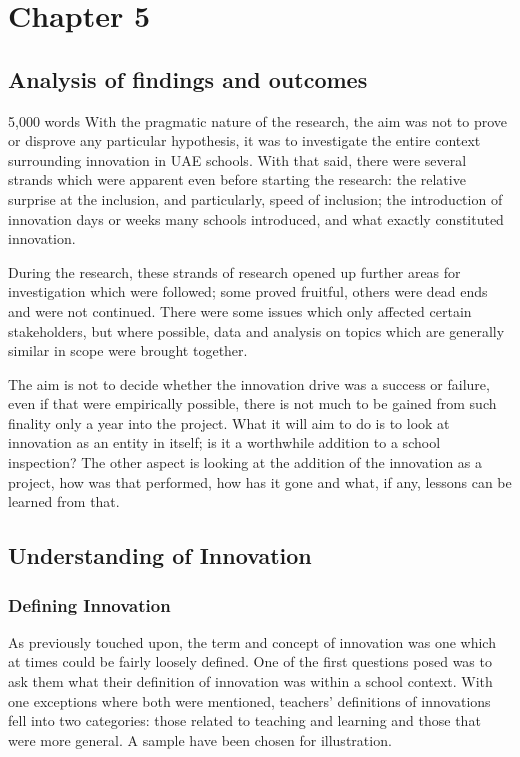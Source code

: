 \section{Chapter 5}
\subsection{Analysis of findings and outcomes}
5,000 words
With the pragmatic nature of the research, the aim was not to prove or disprove any particular hypothesis, it was to investigate the entire context surrounding innovation in UAE schools. With that said, there were several strands which were apparent even before starting the research: the relative surprise at the inclusion, and particularly, speed of inclusion; the introduction of innovation days or weeks many schools introduced, and what exactly constituted innovation.

During the research, these strands of research opened up further areas for investigation which were followed; some proved fruitful, others were dead ends and were not continued. There were some issues which only affected certain stakeholders, but where possible, data and analysis on topics which are generally similar in scope were brought together.

The aim is not to decide whether the innovation drive was a success or failure, even if that were empirically possible, there is not much to be gained from such finality only a year into the project. What it will aim to do is to look at innovation as an entity in itself; is it a worthwhile addition to a school inspection? The other aspect is looking at the addition of the innovation as a project, how was that performed, how has it gone and what, if any, lessons can be learned from that.

\subsection{Understanding of Innovation}
\subsubsection{Defining Innovation}
As previously touched upon, the term and concept of innovation was one which at times could be fairly loosely defined. One of the first questions posed was to ask them what their definition of innovation was within a school context. With one exceptions where both were mentioned, teachers' definitions of innovations fell into two categories: those related to teaching and learning and those that were more general. A sample have been chosen for illustration.

